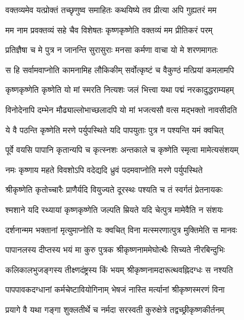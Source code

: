 

\addtocounter{shlokacount}{31}


\twolineshloka
{वक्तव्यमेव यत्प्रोक्तं तच्छृणुष्व समाहितः}
{कथयिष्ये तव प्रीत्या अपि गुह्यतरं मम} %

\twolineshloka
{मम नाम प्रवक्तव्यं सहे चैव विशेषतः}
{कृष्णकृष्णेति वक्तव्यं मम प्रीतिकरं परम्} %

\twolineshloka
{प्रतिज्ञैषा च मे पुत्र न जानन्ति सुरासुराः}
{मनसा कर्मणा वाचा यो मे शरणमागतः} %

\twolineshloka
{स हि सर्वामवाप्नोति कामनामिह लौकिकीम्}
{सर्वोत्कृष्टं च वैकुण्ठं मत्प्रियां कमलामपि} %

\twolineshloka
{कृष्णकृष्णेति कृष्णेति यो मां स्मरति नित्यशः}
{जलं भित्त्वा यथा पद्मं नरकादुद्धराम्यहम्} %

\twolineshloka
{विनोदेनापि दम्भेन मौढ्याल्लोभाच्छलादपि}
{यो मां भजत्यसौ वत्स मद्भक्तो नावसीदति} %

\twolineshloka
{ये वै पठन्ति कृष्णेति मरणे पर्युपस्थिते}
{यदि पापयुताः पुत्र न पश्यन्ति यमं क्वचित्} %

\twolineshloka
{पूर्वे वयसि पापानि कृतान्यपि च कृत्स्नशः}
{अन्तकाले च कृष्णेति स्मृत्वा मामेत्यसंशयम्} %

\twolineshloka
{नमः कृष्णाय महते विवशोऽपि वदेद्यदि}
{ध्रुवं पदमवाप्नोति मरणे पर्युपस्थिते} %

\twolineshloka
{श्रीकृष्णेति कृतोच्चारैः प्राणैर्यदि वियुज्यते}
{दूरस्थः पश्यति च तं स्वर्गतं प्रेतनायकः} %

\twolineshloka
{श्मशाने यदि रथ्यायां कृष्णकृष्णेति जल्पति}
{म्रियते यदि चेत्पुत्र मामेवैति न संशयः} %

\twolineshloka
{दर्शनान्मम भक्तानां मृत्युमाप्नोति यः क्वचित्}
{विना मत्स्मरणात्पुत्र मुक्तिमेति स मानवः} %

\twolineshloka
{पापानलस्य दीप्तस्य भयं मा कुरु पुत्रक}
{श्रीकृष्णनाममेघोत्थैः सिच्यते नीरबिन्दुभिः} %

\twolineshloka
{कलिकालभुजङ्गस्य तीक्ष्णदंष्ट्रस्य किं भयम्}
{श्रीकृष्णनामदारूत्थवह्निदग्धः स नश्यति} %

\twolineshloka
{पापपावकदग्धानां कर्मचेष्टावियोगिनाम्}
{भेषजं नास्ति मर्त्यानां श्रीकृष्णस्मरणं विना} %

\twolineshloka
{प्रयागे वै यथा गङ्गा शुक्लतीर्थे च नर्मदा}
{सरस्वती कुरुक्षेत्रे तद्वच्छ्रीकृष्णकीर्तनम्} %

